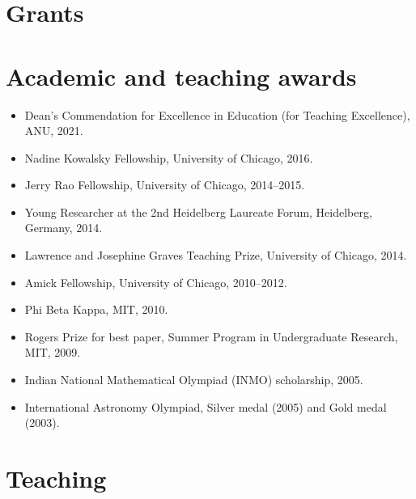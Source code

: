 \documentclass[a4paper]{moderncv}
\begin{document}
\section{Grants}
\label{sec:org04c8d6d}

\section{Academic and teaching awards}
\label{sec:orgfc08e6b}
\begin{itemize}
\item Dean's Commendation for Excellence in Education (for Teaching Excellence), ANU, 2021.
\item Nadine Kowalsky Fellowship, University of Chicago, 2016.
\item Jerry Rao Fellowship, University of Chicago, 2014--2015.
\item Young Researcher at the 2nd Heidelberg Laureate Forum, Heidelberg, Germany, 2014.
\item Lawrence and Josephine Graves Teaching Prize, University of Chicago, 2014.
\item Amick Fellowship, University of Chicago, 2010--2012.
\item Phi Beta Kappa, MIT, 2010.
\item Rogers Prize for best paper, Summer Program in Undergraduate Research, MIT, 2009.
\item Indian National Mathematical Olympiad (INMO) scholarship, 2005.
\item International Astronomy Olympiad, Silver medal (2005) and Gold medal (2003).
\end{itemize}

\section{Teaching}
\label{sec:orgaf92ffb}
\end{document}
